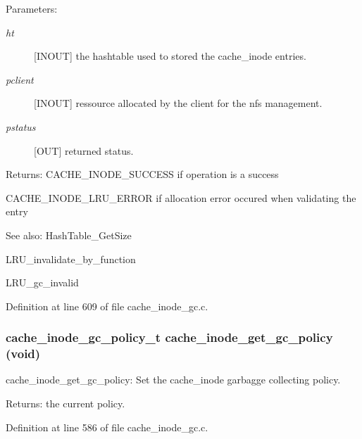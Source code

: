 \begin{Desc}
\item[Parameters:]
\begin{description}
\item[{\em ht}][INOUT] the hashtable used to stored the cache\_\-inode entries. \item[{\em pclient}][INOUT] ressource allocated by the client for the nfs management. \item[{\em pstatus}][OUT] returned status.\end{description}
\end{Desc}
\begin{Desc}
\item[Returns:]CACHE\_\-INODE\_\-SUCCESS if operation is a success \par
 

CACHE\_\-INODE\_\-LRU\_\-ERROR if allocation error occured when validating the entry\end{Desc}
\begin{Desc}
\item[See also:]HashTable\_\-GetSize 

LRU\_\-invalidate\_\-by\_\-function 

LRU\_\-gc\_\-invalid \end{Desc}


Definition at line 609 of file cache\_\-inode\_\-gc.c.
\subsubsection[{cache\_\-inode\_\-get\_\-gc\_\-policy}]{\setlength{\rightskip}{0pt plus 5cm}cache\_\-inode\_\-gc\_\-policy\_\-t cache\_\-inode\_\-get\_\-gc\_\-policy (void)}\label{group__Cache__inode__gc__interface_gb355d80bfbbb711ce94b45b7a3cc7df9}


cache\_\-inode\_\-get\_\-gc\_\-policy: Set the cache\_\-inode garbagge collecting policy.

\begin{Desc}
\item[Returns:]the current policy. \end{Desc}


Definition at line 586 of file cache\_\-inode\_\-gc.c.
